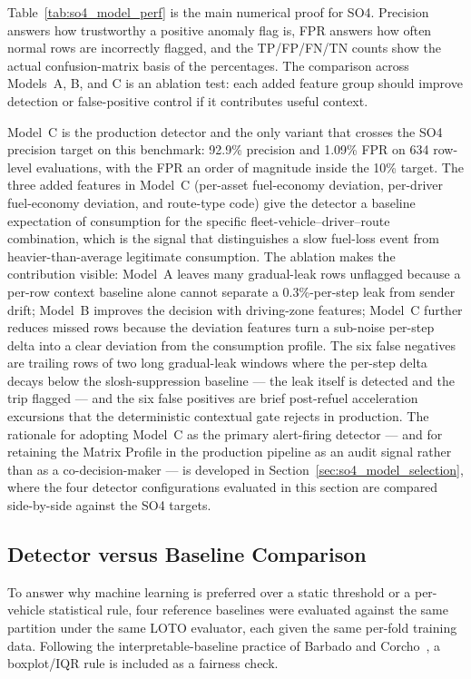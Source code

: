 Table~\ref{tab:so4_model_perf} is the main numerical proof for SO4. Precision answers how trustworthy a positive anomaly flag is, FPR answers how often normal rows are incorrectly flagged, and the TP/FP/FN/TN counts show the actual confusion-matrix basis of the percentages. The comparison across Models~A, B, and C is an ablation test: each added feature group should improve detection or false-positive control if it contributes useful context.

Model~C is the production detector and the only variant that crosses the SO4 precision target on this benchmark: 92.9\% precision and 1.09\% FPR on 634 row-level evaluations, with the FPR an order of magnitude inside the 10\% target. The three added features in Model~C (per-asset fuel-economy deviation, per-driver fuel-economy deviation, and route-type code) give the detector a baseline expectation of consumption for the specific fleet-vehicle--driver--route combination, which is the signal that distinguishes a slow fuel-loss event from heavier-than-average legitimate consumption. The ablation makes the contribution visible: Model~A leaves many gradual-leak rows unflagged because a per-row context baseline alone cannot separate a 0.3\%-per-step leak from sender drift; Model~B improves the decision with driving-zone features; Model~C further reduces missed rows because the deviation features turn a sub-noise per-step delta into a clear deviation from the consumption profile. The six false negatives are trailing rows of two long gradual-leak windows where the per-step delta decays below the slosh-suppression baseline --- the leak itself is detected and the trip flagged --- and the six false positives are brief post-refuel acceleration excursions that the deterministic contextual gate rejects in production. The rationale for adopting Model~C as the primary alert-firing detector --- and for retaining the Matrix Profile in the production pipeline as an audit signal rather than as a co-decision-maker --- is developed in Section~\ref{sec:so4_model_selection}, where the four detector configurations evaluated in this section are compared side-by-side against the SO4 targets.

\subsection{Detector versus Baseline Comparison}
To answer why machine learning is preferred over a static threshold or a per-vehicle statistical rule, four reference baselines were evaluated against the same partition under the same LOTO evaluator, each given the same per-fold training data. Following the interpretable-baseline practice of Barbado and Corcho~\cite{barbado2022interpretable}, a boxplot/IQR rule is included as a fairness check.

